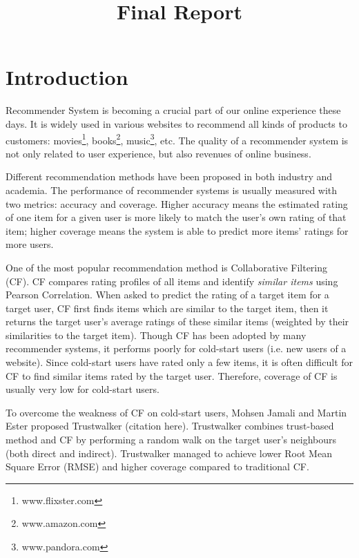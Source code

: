 \documentclass[12pt]{article}
\title{Final Report}
\author{}
\begin{document}
\maketitle

\section{Introduction}
Recommender System is becoming a crucial part of our online experience these days. It is widely used in various websites to recommend all kinds of products to customers: movies\footnote[1]{www.flixster.com}, books\footnote[2]{www.amazon.com}, music\footnote[3]{www.pandora.com}, etc. The quality of a recommender system is not only related to user experience, but also revenues of online business.  

Different recommendation methods have been proposed in both industry and academia. The performance of recommender systems is usually measured with two metrics: accuracy and coverage. Higher accuracy means the estimated rating of one item for a given user is more likely to match the user's own rating of that item; higher coverage means the system is able to predict more items' ratings for more users. 

One of the most popular recommendation method is Collaborative Filtering (CF). CF compares rating profiles of all items and identify \emph{similar items} using Pearson Correlation. When asked to predict the rating of a target item for a target user, CF first finds items which are similar to the target item, then it returns the target user's average ratings of these similar items (weighted by their similarities to the target item). Though CF has been adopted by many recommender systems, it performs poorly for cold-start users (i.e. new users of a website). Since cold-start users have rated only a few items, it is often difficult for CF to find similar items rated by the target user. Therefore, coverage of CF is usually very low for cold-start users. 

To overcome the weakness of CF on cold-start users, Mohsen Jamali and Martin Ester proposed Trustwalker (citation here). Trustwalker combines trust-based method and CF by performing a random walk on the target user's neighbours (both direct and indirect). Trustwalker managed to achieve lower Root Mean Square Error (RMSE) and higher coverage compared to traditional CF. 
\end{document}
